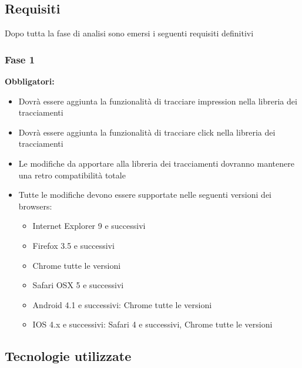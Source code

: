 \documentclass[a4paper, 12pt, twoside, openright]{book}
\begin{document}
\subsection{Requisiti}
Dopo tutta la fase di analisi sono emersi i seguenti requisiti definitivi

\subsubsection{Fase 1}
\textbf{Obbligatori:}
\begin{itemize}
\item Dovrà essere aggiunta la funzionalità di tracciare impression nella libreria dei tracciamenti
\item Dovrà essere aggiunta la funzionalità di tracciare click nella libreria dei tracciamenti
\item Le modifiche da apportare alla libreria dei tracciamenti dovranno mantenere una retro compatibilità totale
\item Tutte le modifiche devono essere supportate nelle seguenti versioni dei browsers:
	\begin{itemize}
	\item Internet Explorer 9 e successivi
	\item Firefox 3.5 e successivi
	\item Chrome tutte le versioni
	\item Safari OSX 5 e successivi
	\item Android 4.1 e successivi: Chrome tutte le versioni
	\item IOS 4.x e successivi: Safari 4 e successivi, Chrome tutte le versioni
	\end{itemize}
\end{itemize}



\subsection{Tecnologie utilizzate}

\end{document}
